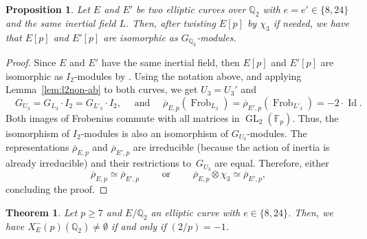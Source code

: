 \documentclass[12pt]{amsart}
\numberwithin{equation}{section}
\newtheorem{theorem}[equation]{Theorem}
\newtheorem{proposition}[equation]{Proposition}
\theoremstyle{definition}
\newcommand{\F}{\mathbb{F}}
\newcommand{\Q}{\mathbb{Q}}
\newcommand{\rhobar}{{\overline{\rho}}}
\newcommand{\Xp}{X_E^{-}(p)}
\DeclareMathOperator{\GL}{GL}
\DeclareMathOperator{\Frob}{Frob}
\DeclareMathOperator{\Id}{Id}
\begin{document}
\begin{proposition}\label{prop:l2non-ab}
    Let $E$ and $E'$ be two elliptic curves over $\Q_2$ with $e=e' \in \{8,24\}$
    and the same inertial field $L$.
    Then, after twisting $E[p]$ by $\chi_3$ if needed, we have that $E[p]$ and $E'[p]$ are isomorphic as $G_{\Q_2}$-modules.
\end{proposition}
\begin{proof} Since $E$ and $E'$ have the same inertial field, then $E[p]$ and $E'[p]$ are isomorphic as $I_2$-modules by \cite[Theorems 7 and 8]{symplectic}. Using the notation above, and applying
Lemma~\ref{lem:l2non-ab} to both curves, we get $U_3 = U_3'$ and
\[
  \quad G_{U_3}=G_{L_3} \cdot I_2  = G_{L'_3} \cdot I_2, \quad \text{ and } \quad
  \rhobar_{E,p}(\Frob_{L_3})=\rhobar_{E',p}(\Frob_{L'_3})=-2\cdot\Id.
\]
Both images of Frobenius commute with all matrices in $\GL_2(\F_p)$.
 Thus, the isomorphism of $I_2$-modules is also an isomorphism of $G_{U_3}$-modules.
The representations $\rhobar_{E,p}$ and $\rhobar_{E',p}$ are irreducible (because the action of inertia is already irreducible) and their restrictions to~$G_{U_3}$ are equal. Therefore, either
    \[
    \rhobar_{E,p} \simeq \rhobar_{E',p}\qquad\text{ or } \qquad\rhobar_{E,p} \otimes \chi_3 \simeq \rhobar_{E',p},
    \]
concluding the proof.
\end{proof}
\begin{theorem}\label{thm:l2n-abinertia}
    Let $p\geq 7$ and $E/\Q_2$ an elliptic curve with $e\in \{8,24\}$. Then, we have $\Xp(\Q_2)\neq \emptyset$ if and only if $(2/p)=-1$.
\end{theorem}
\end{document}

